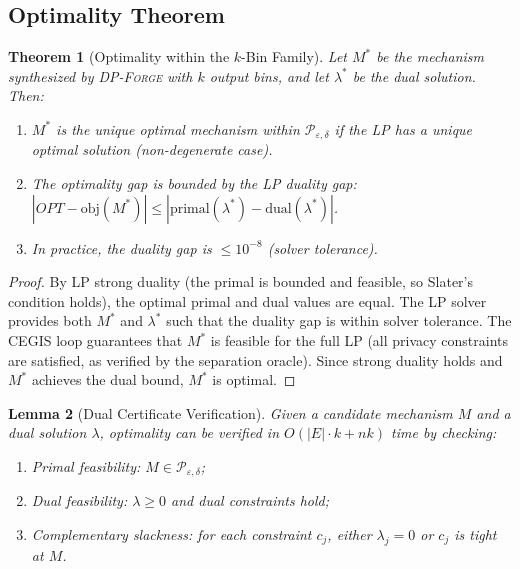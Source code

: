 \documentclass[11pt,a4paper]{article}
\newcommand{\dpforge}{\textsc{DP-Forge}}
\newcommand{\eps}{\varepsilon}
\newcommand{\cP}{\mathcal{P}}
\newtheorem{theorem}{Theorem}[section]
\newtheorem{lemma}[theorem]{Lemma}
\begin{document}
\subsection{Optimality Theorem}
\label{subsec:optimality}

\begin{theorem}[Optimality within the $k$-Bin Family]
\label{thm:optimality}
Let $M^*$ be the mechanism synthesized by \dpforge{} with $k$ output bins, and
let $\lambda^*$ be the dual solution.  Then:
\begin{enumerate}[nosep]
  \item $M^*$ is the unique optimal mechanism within $\cP_{\eps,\delta}$ if the
        LP has a unique optimal solution (non-degenerate case).
  \item The optimality gap is bounded by the LP duality gap:
        $|OPT - \text{obj}(M^*)| \le |\text{primal}(\lambda^*) - \text{dual}(\lambda^*)|$.
  \item In practice, the duality gap is $\le 10^{-8}$ (solver tolerance).
\end{enumerate}
\end{theorem}

\begin{proof}
By LP strong duality (the primal is bounded and feasible, so Slater's condition
holds), the optimal primal and dual values are equal.  The LP solver provides
both $M^*$ and $\lambda^*$ such that the duality gap is within solver tolerance.
The CEGIS loop guarantees that $M^*$ is feasible for the full LP (all privacy
constraints are satisfied, as verified by the separation oracle).  Since strong
duality holds and $M^*$ achieves the dual bound, $M^*$ is optimal.
\end{proof}

\begin{lemma}[Dual Certificate Verification]
\label{lem:dual_verify}
Given a candidate mechanism $M$ and a dual solution $\lambda$, optimality can
be verified in $O(|E| \cdot k + nk)$ time by checking:
\begin{enumerate}[nosep]
  \item Primal feasibility: $M \in \cP_{\eps,\delta}$;
  \item Dual feasibility: $\lambda \ge 0$ and dual constraints hold;
  \item Complementary slackness: for each constraint $c_j$, either $\lambda_j = 0$
        or $c_j$ is tight at $M$.
\end{enumerate}
\end{lemma}
\end{document}

